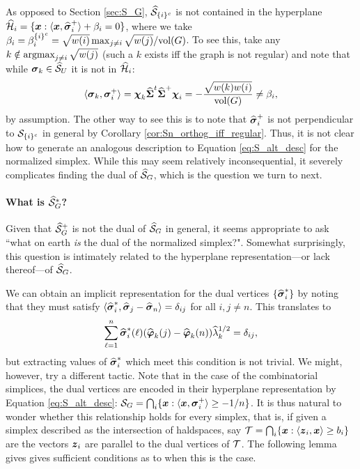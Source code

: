 As opposed to Section \ref{sec:S_G}, $\widehat{\mathcal{S}}_{\{i\}^c} $ is not contained in the hyperplane $\widehat{\mathcal{H}}_i = \{\vb*{x}: \langle \vb*{x},\widehat{\vb*{\sigma}}_i^+\rangle + \beta_i=0\}$, where we take $\beta_i = \beta_i^{\{i\}^c} = \sqrt{w(i)}\max_{j\neq i}\sqrt{w(j)} / \textnormal{vol}(G)$. To see this, take any $k\notin \operatorname*{\textnormal{argmax}}_{j\neq i} \sqrt{w(j)}$ (such a $k$ exists iff the graph is not regular) and note that while $\vb*{\sigma}_k\in\widehat{\mathcal{S}}_U$ it is not in $\widehat{\mathcal{H}}_i$: 
\[\langle \vb*{\sigma}_k,\vb*{\sigma}_i^+\rangle = \boldsymbol{\chi}_k\widehat{\boldsymbol{\Sigma}}^t\widehat{\boldsymbol{\Sigma}}^+\boldsymbol{\chi}_i = -\frac{\sqrt{w(k)w(i)}}{\textnormal{vol}(G)}\neq \beta_i,\]
by assumption. The other way to see this is to note that $\widehat{\vb*{\sigma}}_i^+$ is not perpendicular to $\mathcal{S}_{\{i\}^c}$ in general by Corollary \ref{cor:Sn_orthog_iff_regular}. Thus, it is not  clear how to generate an analogous description to Equation \eqref{eq:S_alt_desc} for the normalized simplex. While this may seem relatively inconsequential, it severely complicates finding the dual of $\widehat{\mathcal{S}}_G$, which is the question we turn to next. 


\paragraph{What is $\widehat{\mathcal{S}}_G^*$?} 
Given that $\widehat{\mathcal{S}}_G^+$ is not the dual of $\widehat{\mathcal{S}}_G$ in general, it  seems appropriate  to  ask ``what on  earth \emph{is} the dual of the normalized simplex?". Somewhat surprisingly, this question is intimately related to the hyperplane representation---or lack thereof---of $\widehat{\mathcal{S}}_G$. 

We can obtain an implicit representation for the dual vertices $\{\widehat{\vb*{\sigma}}^*_i\}$ by noting that they must satisfy  $\langle \widehat{\vb*{\sigma}}^*_i,\widehat{\vb*{\sigma}}_j-\widehat{\vb*{\sigma}}_n\rangle=\delta_{ij}$ for all $i,j\neq n$. This translates to 
\begin{equation*}
\sum_{\ell=1}^n \widehat{\vb*{\sigma}}^*_i(\ell)(\widehat{\vb*{\varphi}}_k(j)-\widehat{\vb*{\varphi}}_k(n))\widehat{\lambda}_k^{1/2}=\delta_{ij},
\end{equation*}
but extracting values of $\widehat{\vb*{\sigma}}^*_i$ which meet this condition is not trivial. 
We might, however, try a different tactic. Note that in the case of the combinatorial simplices, the dual vertices are encoded in their hyperplane representation by Equation \eqref{eq:S_alt_desc}: $\mathcal{S}_G = \bigcap_i\{\vb*{x}:\langle \vb*{x},\vb*{\sigma}_i^+\rangle \geq -1/n\}$. It is thus  natural to wonder whether this relationship holds for every simplex, that is,  if given a simplex described as the intersection of haldspaces, say $\mathcal{T}=\bigcap_i \{\vb*{x}:\langle \vb*{z}_i,\vb*{x}\rangle \geq b_i\}$ are the vectors $\vb*{z}_i$ are parallel to the dual vertices of $\mathcal{T}$.  The following lemma gives gives sufficient conditions as to when this is the case. 

